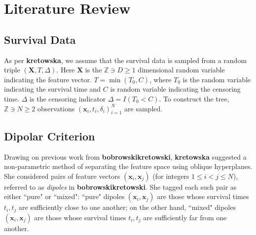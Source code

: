 \documentclass[12pt]{amsart}
\theoremstyle{definition}
\theoremstyle{plain}
\theoremstyle{remark}
\newcommand{\ZZ}{\mathbb{Z}}
\begin{document}
\section{Literature Review} %


\subsection{Survival Data}


As per \textbf{kretowska}, we assume that the survival data is sampled from a random triple $(\mathbf{X}, T, \Delta)$. Here $\mathbf{X}$ is the $\ZZ \ni D \geq 1$ dimensional random variable indicating the feature vector. $T = \min(T_0, C)$, where $T_0$ is the random variable indicating the survival time and $C$ is random variable indicating the censoring time. $\Delta$ is the censoring indicator $\Delta = I(T_0 < C)$. To construct the tree, $\ZZ \ni N \geq 2$ observations $(\mathbf{x}_i, t_i, \delta_i)_{i = 1}^N$ are sampled.

\subsection{Dipolar Criterion}

Drawing on previous work from \textbf{bobrowskikretowski}, \textbf{kretowska} suggested a non-parametric method of separating the feature space using oblique hyperplanes. She considered pairs of feature vectors $(\mathbf{x}_i, \mathbf{x}_j)$ (for integers $1 \leq i < j \leq N$), referred to as \emph{dipoles} in \textbf{bobrowskikretowski}. She tagged each such pair as either ``pure" or ``mixed": ``pure" dipoles $(\mathbf{x}_i, \mathbf{x}_j)$ are those whose survival times $t_i, t_j$ are sufficiently close to one another; on the other hand, ``mixed" dipoles $(\mathbf{x}_i, \mathbf{x}_j)$ are those whose survival times $t_i, t_j$ are sufficiently far from one another.\\
\end{document}
